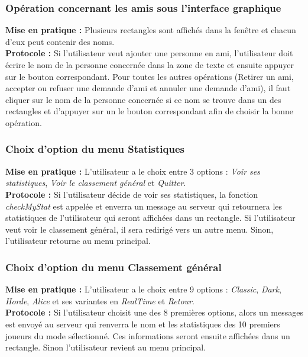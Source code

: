 \documentclass[10pt, a4paper]{article}
\begin{document}
\subsubsection{Opération concernant les amis sous l'interface graphique}
\textbf{Mise en pratique :} Plusieurs rectangles sont affichés dans la fenêtre et chacun d'eux peut contenir des noms. \\
\textbf{Protocole :} Si l'utilisateur veut ajouter une personne en ami, l'utilisateur doit écrire le nom de la personne concernée dans la zone de texte et ensuite appuyer sur le bouton correspondant. Pour toutes les autres opérations (Retirer un ami, accepter ou refuser une demande d'ami et annuler une demande d'ami), il faut cliquer sur le nom de la personne concernée si ce nom se trouve dans un des rectangles et d'appuyer sur un le bouton correspondant afin de choisir la bonne opération. \\

\subsubsection{Choix d'option du menu Statistiques}
\textbf{Mise en pratique :} L'utilisateur a le choix entre 3 options : \textit{Voir ses statistiques}, \textit{Voir le classement général} et \textit{Quitter}.\\
\textbf{Protocole :} Si l'utilisateur décide de voir ses statistiques, la fonction \textit{checkMyStat} est appelée et enverra un message au serveur qui retournera les statistiques de l'utilisateur qui seront affichées dans un rectangle. Si l'utilisateur veut voir le classement général, il sera redirigé vers un autre menu. Sinon, l'utilisateur retourne au menu principal.\\

\subsubsection{Choix d'option du menu Classement général}
\textbf{Mise en pratique :} L'utilisateur a le choix entre 9 options : \textit{Classic}, \textit{Dark}, \textit{Horde}, \textit{Alice} et ses variantes en \textit{RealTime} et \textit{Retour}. \\
\textbf{Protocole :} Si l'utilisateur choisit une des 8 premières options, alors un messages est envoyé au serveur qui renverra le nom et les statistiques des 10 premiers joueurs du mode sélectionné. Ces informations seront ensuite affichées dans un rectangle. Sinon l'utilisateur revient au menu principal.\\
\end{document}
